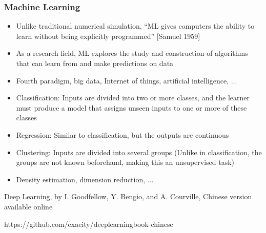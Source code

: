 \begin{frame}
  \MyLogo
  \frametitle{Machine Learning}  
\small

\medskip

\begin{itemize}

\item Unlike traditional numerical simulation, ``ML gives computers the ability to learn without being explicitly programmed'' {\footnotesize\color{DarkOrchid}[Samuel 1959]}

\item As a research field, ML explores the study and construction of algorithms that can {learn} from and {make predictions} on \alert{data}

\item Fourth paradigm, big data, Internet of things, artificial intelligence, ...

\end{itemize}


\begin{itemize}

\item[\raisebox{-0.4ex}{\alert{\HandRight}}] Classification: Inputs are divided into two or more classes, and the learner must produce a model that assigns unseen inputs to one or more of these classes

\item[\raisebox{-0.4ex}{\alert{\HandRight}}] Regression: Similar to classification, but the outputs are continuous

\item[\raisebox{-0.4ex}{\PencilRight}] Clustering: Inputs are divided into several groups (Unlike in classification, the groups are not known beforehand, making this an unsupervised task)

\item[\raisebox{-0.4ex}{\PencilRight}] Density estimation, dimension reduction, ...

\end{itemize}

\vfill
\begin{center}
{\color{red} \scriptsize
Deep Learning, by I. Goodfellow, Y. Bengio, and A. Courville, Chinese version available online

https://github.com/exacity/deeplearningbook-chinese
}
\end{center}
\end{frame}

